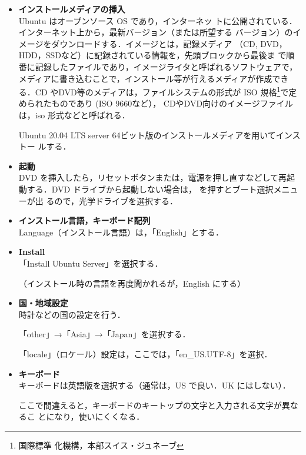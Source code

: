 \begin{itemize}
\item{\bf インストールメディアの挿入} \\
Ubuntu はオープンソース OS であり，インターネッ
トに公開されている．インターネット上から，最新バージョン（または所望する
バージョン）のイメージをダウンロードする．イメージとは，記録メディア
（CD, DVD，HDD，SSDなど）に記録されている情報を，先頭ブロックから最後ま
で順番に記録したファイルであり，イメージライタと呼ばれるソフトウェアで，
メディアに書き込むことで，インストール等が行えるメディアが作成できる．CD 
やDVD等のメディアは，ファイルシステムの形式が ISO 規格\footnote{国際標準
化機構，本部スイス・ジュネーブ}で定められたものであり (ISO 9660など），
CDやDVD向けのイメージファイルは，iso 形式などと呼ばれる．

Ubuntu 20.04 LTS server 64ビット版のインストールメディアを用いてインストー
     ルする．

\item{\bf 起動}\\
DVD を挿入したら，リセットボタンまたは，電源を押し直すなどして再起動する．DVD
ドライブから起動しない場合は， を押すとブート選択メニューが出
るので，光学ドライブを選択する．

\item{\bf インストール言語，キーボード配列}\\

Language（インストール言語）は，「English」とする．

\item{\bf Install}\\

「Install Ubuntu Server」を選択する．

（インストール時の言語を再度聞かれるが，English にする）

\item{\bf 国・地域設定}\\

時計などの国の設定を行う．

「other」→「Asia」→「Japan」を選択する．

「locale」（ロケール）設定は，ここでは，「en\_US.UTF-8」を選択．

\item{\bf キーボード}\\

キーボードは英語版を選択する（通常は，US で良い．UK にはしない）．

ここで間違えると，キーボードのキートップの文字と入力される文字が異なるこ
とになり，使いにくくなる．


\end{itemize}
